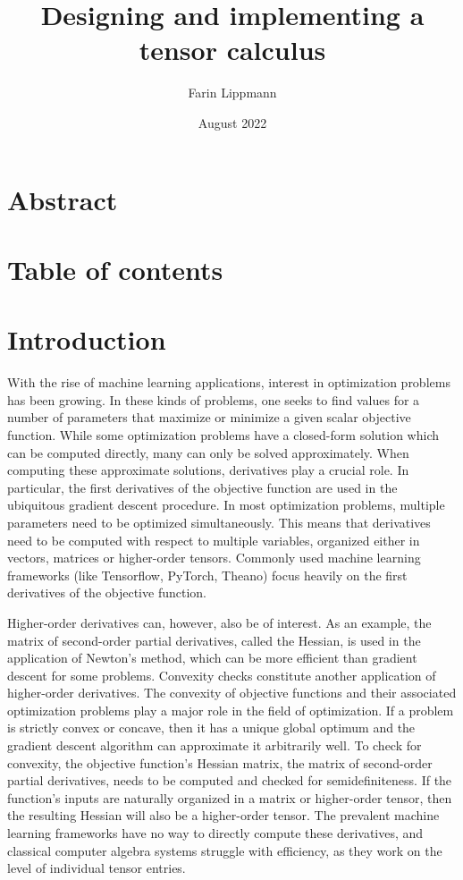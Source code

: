 \documentclass[12pt, a4paper]{report}
\title{Designing and implementing a tensor calculus}
\author{Farin Lippmann}
\date{August 2022}
\begin{document}
\maketitle

\chapter{Abstract}

\chapter{Table of contents}
\setcounter{page}{3}

\chapter{Introduction}

With the rise of machine learning applications, interest in optimization problems has been growing.
In these kinds of problems, one seeks to find values for a number of parameters that maximize or minimize a given scalar objective function.
While some optimization problems have a closed-form solution which can be computed directly, many can only be solved approximately.
When computing these approximate solutions, derivatives play a crucial role.
In particular, the first derivatives of the objective function are used in the ubiquitous gradient descent procedure.
In most optimization problems, multiple parameters need to be optimized simultaneously.
This means that derivatives need to be computed with respect to multiple variables, organized either in vectors, matrices or higher-order tensors.
Commonly used machine learning frameworks (like Tensorflow, PyTorch, Theano) focus heavily on the first derivatives of the objective function.

Higher-order derivatives can, however, also be of interest.
As an example, the matrix of second-order partial derivatives, called the Hessian, is used in the application of Newton's method, which can be more efficient than gradient descent for some problems.
Convexity checks constitute another application of higher-order derivatives.
The convexity of objective functions and their associated optimization problems play a major role in the field of optimization.
If a problem is strictly convex or concave, then it has a unique global optimum and the gradient descent algorithm can approximate it arbitrarily well.
To check for convexity, the objective function's Hessian matrix, the matrix of second-order partial derivatives, needs to be computed and checked for semidefiniteness.
If the function's inputs are naturally organized in a matrix or higher-order tensor, then the resulting Hessian will also be a higher-order tensor.
The prevalent machine learning frameworks have no way to directly compute these derivatives, and classical computer algebra systems struggle with efficiency, as they work on the level of individual tensor entries.
\end{document}

